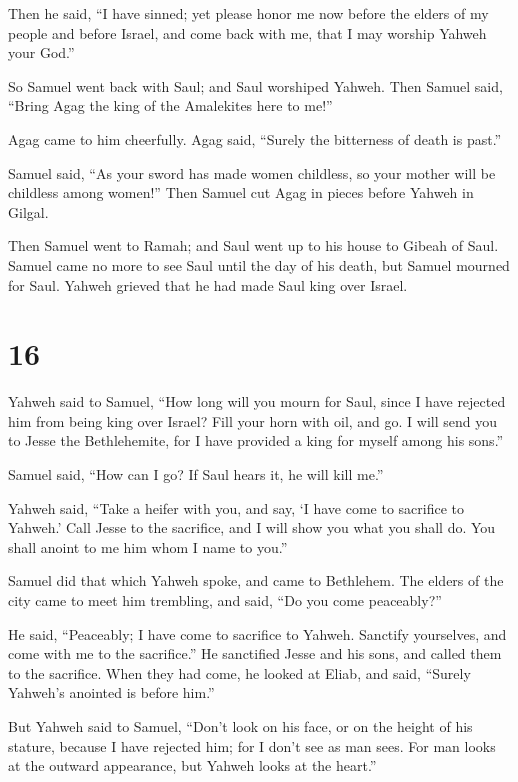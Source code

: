  Then he said, ``I have sinned; yet please honor me now
before the elders of my people and before Israel, and come back with me,
that I may worship Yahweh your God.''

 So Samuel went back with Saul; and Saul worshiped Yahweh.
 Then Samuel said, ``Bring Agag the king of the Amalekites
here to me!''

Agag came to him cheerfully. Agag said, ``Surely the bitterness of death
is past.''

 Samuel said, ``As your sword has made women childless, so
your mother will be childless among women!'' Then Samuel cut Agag in
pieces before Yahweh in Gilgal.

 Then Samuel went to Ramah; and Saul went up to his house
to Gibeah of Saul.  Samuel came no more to see Saul until
the day of his death, but Samuel mourned for Saul. Yahweh grieved that
he had made Saul king over Israel.

\hypertarget{section-15}{%
\section{16}\label{section-15}}

 Yahweh said to Samuel, ``How long will you mourn for Saul,
since I have rejected him from being king over Israel? Fill your horn
with oil, and go. I will send you to Jesse the Bethlehemite, for I have
provided a king for myself among his sons.''

 Samuel said, ``How can I go? If Saul hears it, he will kill
me.''

Yahweh said, ``Take a heifer with you, and say, `I have come to
sacrifice to Yahweh.'  Call Jesse to the sacrifice, and I
will show you what you shall do. You shall anoint to me him whom I name
to you.''

 Samuel did that which Yahweh spoke, and came to Bethlehem.
The elders of the city came to meet him trembling, and said, ``Do you
come peaceably?''

 He said, ``Peaceably; I have come to sacrifice to Yahweh.
Sanctify yourselves, and come with me to the sacrifice.'' He sanctified
Jesse and his sons, and called them to the sacrifice.  When
they had come, he looked at Eliab, and said, ``Surely Yahweh's anointed
is before him.''

 But Yahweh said to Samuel, ``Don't look on his face, or on
the height of his stature, because I have rejected him; for I don't see
as man sees. For man looks at the outward appearance, but Yahweh looks
at the heart.''

